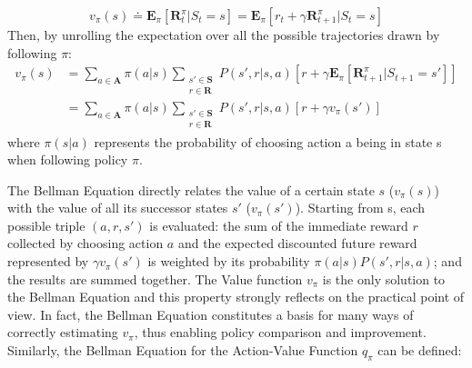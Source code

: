             \begin{definition}
                \label{def:bellmanvalue}
                \[ v_{\pi}(s) \doteq \mathbf{E}_{\pi} \left[ \mathbf{R}_{t}^{\pi} | S_{t} = s \right] =
                    \mathbf{E}_{\pi} \left[ r_{t} + \gamma \mathbf{R}_{t+1}^{\pi} | S_{t} = s \right] \]
                Then, by unrolling the expectation over all the possible trajectories drawn by following $\pi$:
                \begin{align*}
                    v_{\pi}(s) &= \sum_{a \in \mathbf{A}} \pi(a|s) 
                                \sum_{\substack{s' \in \mathbf{S}\\r \in \mathbf{R}}} P(s', r | s, a) 
                                \left[ r + \gamma \mathbf{E}_{\pi} \left[ \mathbf{R}_{t+1}^{\pi} | S_{t+1} = s' \right] \right] \\        
                                &= \sum_{a \in \mathbf{A}} \pi(a|s) 
                                \sum_{\substack{s' \in \mathbf{S}\\r \in \mathbf{R}}} P(s', r | s, a) 
                                \left[ r + \gamma v_{\pi}(s') \right]
                \end{align*}
                where $\pi(s|a)$ represents the probability of choosing action a being in state s when following policy $\pi$.
            \end{definition}
            \noindent
            The Bellman Equation directly relates the value of a certain state $s$ ($v_{\pi}(s)$) with the value of all its successor states $s'$ ($v_{\pi}(s')$). Starting from s, each possible triple $(a, r, s')$ is evaluated: the sum of the immediate reward $r$ collected by choosing action $a$ and the expected discounted future reward represented by $\gamma v_{\pi}(s')$ is weighted by its probability $\pi(a|s)P(s',r|s,a)$; and the results are summed together. The Value function $v_{\pi}$ is the only solution to the Bellman Equation and this property strongly reflects on the practical point of view. In fact, the Bellman Equation constitutes a basis for many ways of correctly estimating $v_{\pi}$, thus enabling policy comparison and improvement. \newline
            Similarly, the Bellman Equation for the Action-Value Function $q_{\pi}$ can be defined:
            
